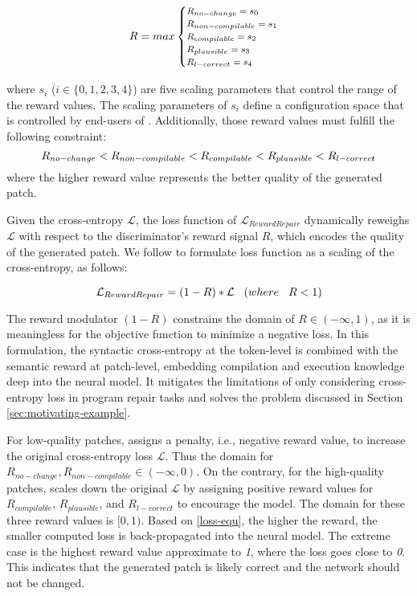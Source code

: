 \begin{equation}
\footnotesize
R = 
max
\begin{cases}
R_{no-change} = s_0\\
R_{non-compilable} = s_1 \\
R_{compilable} = s_2   \\
R_{plausible} = s_3   \\
R_{l-correct} = s_4  \\
\end{cases}
\label{equ-reward-values}
\end{equation}

where  $s_{i}$  ($i\in \{0, 1, 2, 3, 4\}$) are five scaling parameters that control the range of the reward values.
The scaling parameters of $s_{i}$ define a configuration space that is controlled by end-users of \approach. 
Additionally, those reward values must fulfill the following constraint: 
\begin{equation}
\footnotesize
R_{no-change} <  R_{non-compilable} <  R_{compilable} < R_{plausible} <  R_{l-correct}
\end{equation}
where the higher reward value represents the better quality of the generated patch.

Given the cross-entropy $\mathcal{L}$,
the loss function of \approach  $\mathcal{L}_{RewardRepair}$ dynamically reweighs $\mathcal{L}$ with respect to the discriminator's reward signal $R$, which encodes the quality of the generated patch.
We follow \cite{seqGan-aaai17,AnchorLoss} to formulate \approach loss function as a scaling of the cross-entropy, as follows:

\begin{equation}
\footnotesize
\mathcal{L}_{RewardRepair}  = (1-R)*\mathcal{L} \quad  (where \quad R<1)
\label{loss-equ}
\end{equation}

The reward modulator $(1-R)$  constrains the domain of $R \in (-\infty, 1)$, as it is meaningless for the  objective function to minimize a negative loss. 
In this formulation, the
syntactic cross-entropy at the token-level is combined with the semantic reward at patch-level, embedding compilation and execution knowledge deep into the neural model.
It mitigates the limitations of only considering cross-entropy loss in program repair tasks and solves the problem discussed in  Section \ref{sec:motivating-example}. 

For low-quality  patches, \approach assigns a penalty, i.e., negative reward value, to increase the original cross-entropy loss  $\mathcal{L}$. Thus the domain for $R_{no-change}, R_{non-compilable} \in (-\infty, 0)$.
On the contrary, for the high-quality patches, \approach scales down the original $\mathcal{L}$ by assigning positive reward values for $R_{compilable}$, $ R_{plausible}$, and $R_{l-correct}$ to encourage the model. The domain for these three reward values is 
$[0, 1)$.
Based on \autoref{loss-equ}, the higher the reward, the smaller computed loss is back-propagated into the neural model. 
The extreme case is the highest reward value approximate to \textit{1}, where the \approach loss goes close to \textit{0}. This indicates that the generated patch is likely correct and the network should not be changed. 

